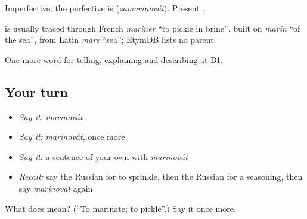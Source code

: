 Imperfective; the perfective is \emph{} (\emph{zamarinovát}). Present \emph{}.

\begin{cousinweb}
\emph{} is usually traced through French \emph{mariner} \textquotedblleft{}to pickle in brine\textquotedblright{}, built on \emph{marin} \textquotedblleft{}of the sea\textquotedblright{}, from Latin \emph{mare} \textquotedblleft{}sea\textquotedblright{}; EtymDB lists no parent.
\end{cousinweb}

\begin{grammarlens}[title={What you've built}]
One more word for telling, explaining and describing at B1.
\end{grammarlens}

\subsection*{Your turn}
\begin{itemize}
\raggedright
  \item \emph{Say it:} \emph{marinovát}
  \item \emph{Say it:} \emph{marinovát}, once more
  \item \emph{Say it:} a sentence of your own with \emph{marinovát}
  \item \emph{Recall:} say the Russian for to sprinkle, then the Russian for a seasoning, then say \emph{marinovát} again
\end{itemize}

\begin{tcolorbox}[breakable,colback=teal!4,colframe=teal!35!black,title={Before you move on}]
What does  mean? (\textquotedblleft{}To marinate; to pickle\textquotedblright{}.) Say it once more.
\end{tcolorbox}

